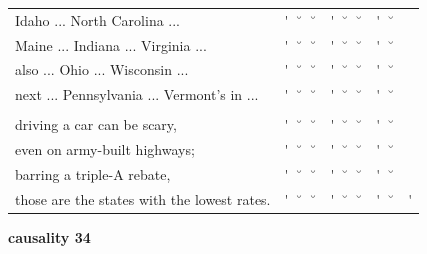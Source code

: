 \documentclass[12pt, landscape]{article}
\begin{document}
\begin{center}
\begin{tabularx}{\textwidth}{
>{\lefting\arraybackslash}X
c
c
c
c
c
c
c
c
c
}

Idaho ... North Carolina ...  & \'{} & \u{} & \u{} & \'{} & \u{} & \u{} & \'{} & \u{} & \\
Maine ... Indiana ... Virginia ... & \'{} & \u{} & \u{} & \'{} & \u{} & \u{} & \'{} & \u{} & \\
also ... Ohio ... Wisconsin ... & \'{} & \u{} & \u{} & \'{} & \u{} & \u{} & \'{} & \u{} & \\
next ... Pennsylvania ... Vermont's in ... & \'{} & \u{} & \u{} & \'{} & \u{} & \u{} & \'{} & \u{} & \\
 & & & & & & & & \\
driving a car can be scary, & \'{} & \u{} & \u{} & \'{} & \u{} & \u{} & \'{} & \u{} & \\
even on army-built highways; & \'{} & \u{} & \u{} & \'{} & \u{} & \u{} & \'{} & \u{} & \\
barring a triple-A rebate, & \'{} & \u{} & \u{} & \'{} & \u{} & \u{} & \'{} & \u{} & \\
those are the states with the lowest rates. & \'{} & \u{} & \u{} & \'{} & \u{} & \u{} & \'{} & \u{} & \'{} \\


\end{tabularx}
\end{center}

\vspace*{\fill}

\newpage

\vspace*{\fill}

\noindent \textbf{causality 34}
\noindent \hfill \par
\end{document}
